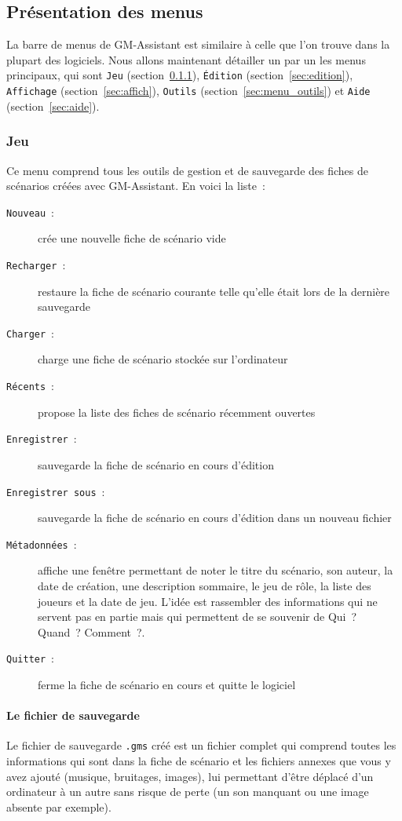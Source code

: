 \documentclass[a4paper,12pt]{article}
\newcommand*{\GMA}{GM-Assistant\xspace}
\newcommand*{\interfaceitem}[1]{\texttt{#1}}
\newcommand*{\guillemets}[1]{\og #1\fg{}\xspace}
\begin{document}
\subsection{Présentation des menus}
\label{menu}

La barre de menus de \GMA est similaire à celle que l'on trouve dans la plupart des logiciels.
Nous allons maintenant détailler un par un les menus principaux, qui sont \interfaceitem{Jeu} (section~\ref{sec:jeu}), \interfaceitem{Édition} (section~\ref{sec:edition}), \interfaceitem{Affichage} (section~\ref{sec:affich}), \interfaceitem{Outils} (section~\ref{sec:menu_outils}) et \interfaceitem{Aide} (section~\ref{sec:aide}).

\subsubsection{Jeu}
\label{sec:jeu}

Ce menu comprend tous les outils de gestion et de sauvegarde des fiches de scénarios créées avec \GMA.
En voici la liste~:
\begin{description}
    \item[\interfaceitem{Nouveau}~:]{crée une nouvelle fiche de scénario vide}
    \item[\interfaceitem{Recharger}~:]{restaure la fiche de scénario courante telle qu'elle était lors de la dernière sauvegarde}
    \item[\interfaceitem{Charger}~:]{charge une fiche de scénario stockée sur l'ordinateur}
    \item[\interfaceitem{Récents}~:]{propose la liste des fiches de scénario récemment ouvertes}
    \item[\interfaceitem{Enregistrer}~:]{sauvegarde la fiche de scénario en cours d'édition}
    \item[\interfaceitem{Enregistrer sous}~:]{sauvegarde la fiche de scénario en cours d'édition dans un nouveau fichier}
    \item[\interfaceitem{Métadonnées}~:]{affiche une fenêtre permettant de noter le titre du scénario, son auteur, la date de création, une description sommaire, le jeu de rôle, la liste des joueurs et la date de jeu.
            L'idée est rassembler des informations qui ne servent pas en partie mais qui permettent de se souvenir de \guillemets{Qui~? Quand~? Comment~?}.}
    \item[\interfaceitem{Quitter}~:]{ferme la fiche de scénario en cours et quitte le logiciel}
\end{description}
\paragraph{Le fichier de sauvegarde}
Le fichier de sauvegarde \texttt{.gms} créé est un fichier complet qui comprend toutes les informations qui sont dans la fiche de scénario et les fichiers annexes que vous y avez ajouté (musique, bruitages, images), lui permettant d'être déplacé d'un ordinateur à un autre sans risque de perte (un son manquant ou une image absente par exemple).
\end{document}
